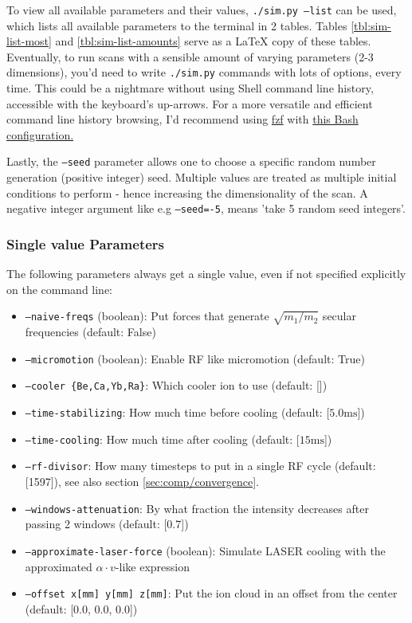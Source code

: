 To view all available parameters and their values, \texttt{./sim.py --list} can be used, which lists all available parameters to the terminal in 2 tables. Tables \ref{tbl:sim-list-most} and \ref{tbl:sim-list-amounts} serve as a LaTeX copy of these tables. Eventually, to run scans with a sensible amount of varying parameters (2-3 dimensions), you'd need to write \texttt{./sim.py} commands with lots of options, every time. This could be a nightmare without using Shell command line history, accessible with the keyboard's up-arrows. For a more versatile and efficient command line history browsing, I'd recommend using \href{https://github.com/junegunn/fzf}{fzf} with \href{https://github.com/junegunn/fzf/blob/d24b58ef3fc6d6d2c43e07a44e0f757b9bdfbeff/shell/key-bindings.bash#L133-L136}{this Bash configuration.}

Lastly, the \texttt{--seed} parameter allows one to choose a specific random number generation (positive integer) seed. Multiple values are treated as multiple initial conditions to perform - hence increasing the dimensionality of the scan. A negative integer argument like e.g \texttt{--seed=-5}, means 'take 5 random seed integers'.

\subsubsection{Single value Parameters}\label{sssec:manual/single-value-params}

The following parameters always get a single value, even if not specified explicitly on the command line:

\begin{itemize}%
    \item \texttt{--naive-freqs} (boolean): Put forces that generate $\sqrt{m_1/m_2}$ secular frequencies (default: False)
    \item \texttt{--micromotion} (boolean): Enable RF like micromotion (default: True)
    \item \texttt{--cooler \{Be,Ca,Yb,Ra\}}: Which cooler ion to use (default: [])
    \item \texttt{--time-stabilizing}: How much time before cooling (default: [$5.0 \mathrm{ms}$])
    \item \texttt{--time-cooling}: How much time after cooling (default: [$15 \mathrm{ms}$])
    \item \texttt{--rf-divisor}: How many timesteps to put in a single RF cycle (default: [1597]), see also section \ref{sec:comp/convergence}.
    \item \texttt{--windows-attenuation}: By what fraction the intensity decreases after passing 2 windows (default: [0.7])
    \item \texttt{--approximate-laser-force} (boolean): Simulate LASER cooling with the approximated $\alpha \cdot v$-like expression
    \item \texttt{--offset x[mm] y[mm] z[mm]}: Put the ion cloud in an offset from the center (default: [0.0, 0.0, 0.0])
\end{itemize}

